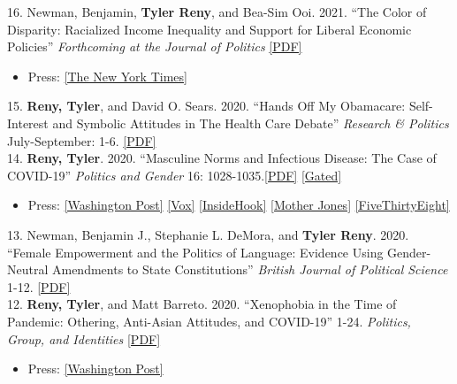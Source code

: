 \documentclass[11pt, a4paper]{article}
\newcommand{\years}[1]{\marginnote{\scriptsize #1}}
\begin{document}
\years{} 16. Newman, Benjamin, \textbf{Tyler Reny}, and Bea-Sim Ooi. 2021. ``The Color of Disparity: Racialized Income Inequality and Support for Liberal Economic Policies'' \textit{Forthcoming at the Journal of Politics} \href{http://tylerreny.github.io/pdf/pubs/newman_reny_ooi_2021.pdf}{[PDF]}
\begin{itemize}
  \item Press: \href{https://www.nytimes.com/2021/09/01/opinion/us-multiracial-democracy.html}{[The New York Times]}
\end{itemize}

\years{2020} 15. \textbf{Reny, Tyler}, and David O. Sears. 2020. ``Hands Off My Obamacare: Self-Interest and Symbolic Attitudes in The Health Care Debate'' \textit{Research \& Politics} July-September: 1-6. \href{https://journals.sagepub.com/doi/full/10.1177/2053168020955108}{[PDF]}\\

\years{} 14. \textbf{Reny, Tyler}. 2020. ``Masculine Norms and Infectious Disease: The Case of COVID-19'' \textit{Politics and Gender} 16: 1028-1035.\href{http://tylerreny.github.io/pdf/pubs/reny_2020_sexism_covid_final_public.pdf}{[PDF]} \href{https://www.cambridge.org/core/journals/politics-and-gender/article/masculine-norms-and-infectious-disease-the-case-of-covid19/730D3884492AEF9F9CCD2AD8B5E429E8}{[Gated]}
\begin{itemize}
  \item Press: \href{https://www.washingtonpost.com/politics/2020/07/16/if-you-think-real-men-dont-wear-masks-youre-more-likely-get-covid-19/}{[Washington Post]} \href{https://www.vox.com/the-goods/21356150/american-men-wont-wear-masks}{[Vox]} \href{https://www.insidehook.com/daily_brief/news-opinion/sexist-men-face-masks}{[InsideHook]} \href{https://www.motherjones.com/coronavirus-updates/2020/10/trump-masks-covid-toxic-masculinity/}{[Mother Jones]} \href{https://fivethirtyeight.com/features/why-so-many-men-stuck-with-trump-in-2020/}{[FiveThirtyEight]}
\end{itemize}

\years{} 13. Newman, Benjamin J., Stephanie L. DeMora, and \textbf{Tyler Reny}. 2020. ``Female Empowerment and the Politics of Language: Evidence Using Gender-Neutral Amendments to State Constitutions'' \textit{British Journal of Political Science} 1-12. \href{http://tylerreny.github.io/pdf/pubs/Newman_DeMora_Reny_2020_BJPolS_Letter_Final.pdf}{[PDF]}  \\

\years{} 12. \textbf{Reny, Tyler}, and Matt Barreto. 2020. ``Xenophobia in the Time of Pandemic: Othering, Anti-Asian Attitudes, and COVID-19'' 1-24. \textit{Politics, Group, and Identities} \href{https://www.dropbox.com/s/3bniukgr62yu02m/Reny_Barreto_COVID_for_sharing.pdf?dl=0}{[PDF]} 
\begin{itemize}
  \item Press: \href{https://www.washingtonpost.com/politics/2020/04/01/americans-who-are-biased-against-asians-are-more-likely-fear-coronavirus/}{[Washington Post]} 
\end{itemize}
\end{document}
